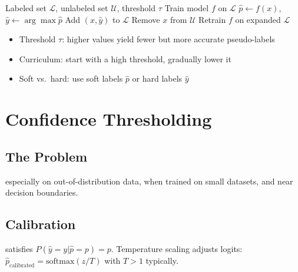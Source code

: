 
\begin{algorithm}[H]
\caption{Basic Pseudo-Labeling}
\begin{algorithmic}[1]
\Require Labeled set $\mathcal{L}$, unlabeled set $\mathcal{U}$, threshold $\tau$
\State Train model $f$ on $\mathcal{L}$
\Repeat
        \State $\hat{p} \gets f(x)$, $\hat{y} \gets \arg\max \hat{p}$
            \State Add $(x, \hat{y})$ to $\mathcal{L}$
            \State Remove $x$ from $\mathcal{U}$
        \EndIf
    \EndFor
    \State Retrain $f$ on expanded $\mathcal{L}$
\end{algorithmic}
\end{algorithm}

\begin{itemize}
    \item Threshold $\tau$: higher values yield fewer but more accurate pseudo-labels
    \item Curriculum: start with a high threshold, gradually lower it
    \item Soft vs.\ hard: use soft labels $\hat{p}$ or hard labels $\hat{y}$
\end{itemize}


\section{Confidence Thresholding}


\subsection{The Problem}

 especially on out-of-distribution data, when trained on small datasets, and near decision boundaries.

\subsection{Calibration}

 satisfies $P(\hat{y} = y | \hat{p} = p) = p$. Temperature scaling adjusts logits: $\hat{p}_{\text{calibrated}} = \text{softmax}(z / T)$ with $T > 1$ typically.


